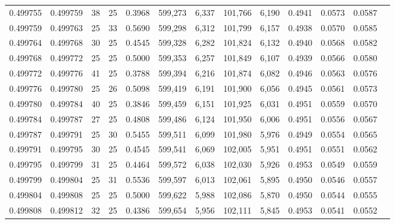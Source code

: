 \begin{tabular}{rrrrrrrrrrrrr}
0.499755 & 0.499759 &    38 &  25 &                                     0.3968 & 599,273 &   6,337 & 101,766 &   6,190 & 0.4941 & 0.0573 & 0.0587 \\
0.499759 & 0.499763 &    25 &  33 &                                     0.5690 & 599,298 &   6,312 & 101,799 &   6,157 & 0.4938 & 0.0570 & 0.0585 \\
0.499764 & 0.499768 &    30 &  25 &                                     0.4545 & 599,328 &   6,282 & 101,824 &   6,132 & 0.4940 & 0.0568 & 0.0582 \\
0.499768 & 0.499772 &    25 &  25 &                                     0.5000 & 599,353 &   6,257 & 101,849 &   6,107 & 0.4939 & 0.0566 & 0.0580 \\
0.499772 & 0.499776 &    41 &  25 &                                     0.3788 & 599,394 &   6,216 & 101,874 &   6,082 & 0.4946 & 0.0563 & 0.0576 \\
0.499776 & 0.499780 &    25 &  26 &                                     0.5098 & 599,419 &   6,191 & 101,900 &   6,056 & 0.4945 & 0.0561 & 0.0573 \\
0.499780 & 0.499784 &    40 &  25 &                                     0.3846 & 599,459 &   6,151 & 101,925 &   6,031 & 0.4951 & 0.0559 & 0.0570 \\
0.499784 & 0.499787 &    27 &  25 &                                     0.4808 & 599,486 &   6,124 & 101,950 &   6,006 & 0.4951 & 0.0556 & 0.0567 \\
0.499787 & 0.499791 &    25 &  30 &                                     0.5455 & 599,511 &   6,099 & 101,980 &   5,976 & 0.4949 & 0.0554 & 0.0565 \\
0.499791 & 0.499795 &    30 &  25 &                                     0.4545 & 599,541 &   6,069 & 102,005 &   5,951 & 0.4951 & 0.0551 & 0.0562 \\
0.499795 & 0.499799 &    31 &  25 &                                     0.4464 & 599,572 &   6,038 & 102,030 &   5,926 & 0.4953 & 0.0549 & 0.0559 \\
0.499799 & 0.499804 &    25 &  31 &                                     0.5536 & 599,597 &   6,013 & 102,061 &   5,895 & 0.4950 & 0.0546 & 0.0557 \\
0.499804 & 0.499808 &    25 &  25 &                                     0.5000 & 599,622 &   5,988 & 102,086 &   5,870 & 0.4950 & 0.0544 & 0.0555 \\
0.499808 & 0.499812 &    32 &  25 &                                     0.4386 & 599,654 &   5,956 & 102,111 &   5,845 & 0.4953 & 0.0541 & 0.0552 \\

\end{tabular}
